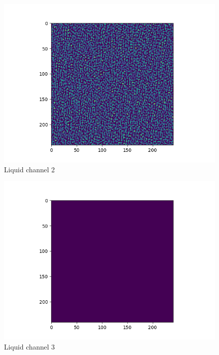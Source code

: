 \documentclass[12pt,reqno]{amsart}
\numberwithin{equation}{section}
\begin{document}
\begin{enumerate}
\begin{figure}[H]
\centering
\includegraphics[scale=0.6]{liquid_channel_2}
\caption{Liquid channel 2}
\end{figure}

\begin{figure}[H]
\centering
\includegraphics[scale=0.6]{liquid_channel_3}
\caption{Liquid channel 3}
\end{figure}


\end{enumerate}
\end{document}
